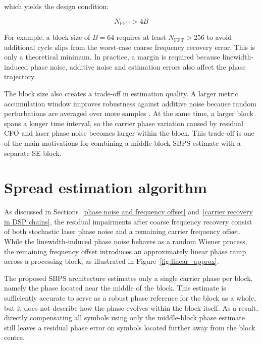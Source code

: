 which yields the design condition:

\begin{equation}
    N_{\mathrm{FFT}} > 4B
\end{equation}

For example, a block size of $B = 64$ requires at least $N_{\mathrm{FFT}} > 256$ to avoid additional cycle slips from the worst-case coarse frequency recovery error. This is only a theoretical minimum. In practice, a margin is required because linewidth-induced phase noise, additive noise and estimation errors also affect the phase trajectory.

The block size also creates a trade-off in estimation quality. A larger metric accumulation window improves robustness against additive noise because random perturbations are averaged over more samples \cite{Mello_2018}. At the same time, a larger block spans a longer time interval, so the carrier phase variation caused by residual \ac{CFO} and laser phase noise becomes larger within the block. This trade-off is one of the main motivations for combining a middle-block \ac{SBPS} estimate with a separate \ac{SE} block.



\section{Spread estimation algorithm}

As discussed in Sections~\ref{phase noise and frequency offset} and~\ref{carrier recovery in DSP chains}, the residual impairments after coarse frequency recovery consist of both stochastic laser phase noise and a remaining carrier frequency offset. While the linewidth-induced phase noise behaves as a random Wiener process, the remaining frequency offset introduces an approximately linear phase ramp across a processing block, as illustrated in Figure~\ref{fig:linear_approx}.

The proposed \ac{SBPS} architecture estimates only a single carrier phase per block, namely the phase located near the middle of the block. This estimate is sufficiently accurate to serve as a robust phase reference for the block as a whole, but it does not describe how the phase evolves within the block itself. As a result, directly compensating all symbols using only the middle-block phase estimate still leaves a residual phase error on symbols located further away from the block centre.

